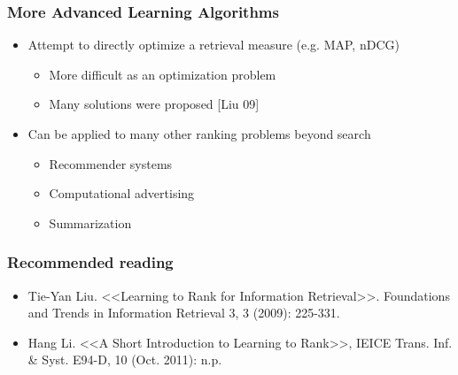 \subsubsection{More Advanced Learning Algorithms}
\begin{itemize}
\item Attempt to directly optimize a retrieval measure (e.g. MAP, nDCG)
\begin{itemize}
\item More difficult as an optimization problem 
\item Many solutions were proposed [Liu 09]
\end{itemize}

\item Can be applied to many other ranking problems beyond search
\begin{itemize}
\item Recommender systems
\item Computational advertising 
\item Summarization
\end{itemize}
\end{itemize}


\subsubsection{Recommended reading}
\begin{itemize}
\item Tie-Yan Liu. <<Learning to Rank for Information Retrieval>>. Foundations and Trends in Information Retrieval 3, 3 (2009): 225-331.
\item Hang Li. <<A Short Introduction to Learning to Rank>>, IEICE Trans. Inf. \& Syst. E94-D, 10 (Oct. 2011): n.p.
\end{itemize}














